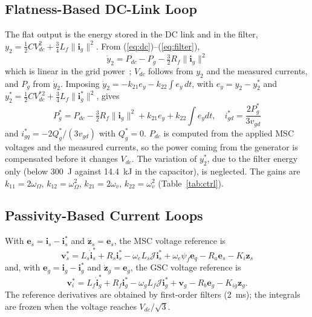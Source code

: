 \documentclass[11pt,a4paper]{article}
\newcommand{\bv}[1]{\mathbf{#1}}
\newcommand{\Jm}{\boldsymbol{\mathcal{J}}}
\begin{document}
\subsection{Flatness-Based DC-Link Loop}
The flat output is the energy stored in the DC link and in the filter,
$y_2=\frac12CV_{dc}^2+\frac34L_f\|\bv{i}_g\|^2$. From (\ref{eq:dc})--(\ref{eq:filter}),
\begin{equation}
\dot y_2 = P_{dc} - P_g - \tfrac32R_f\|\bv{i}_g\|^2
\label{eq:y2}
\end{equation}
which is linear in the grid power~\cite{thounthong2010}; $V_{dc}$ follows from $y_2$ and the measured
currents, and $P_g$ from $\dot y_2$. Imposing $\dot y_2=-k_{21}e_y-k_{22}\int e_y\,dt$, with
$e_y=y_2-y_2^*$ and $y_2^*=\frac12CV_{dc}^{*2}+\frac34L_f\|\bv{i}_g^*\|^2$, gives
\begin{equation}
P_g^* = P_{dc} - \tfrac32R_f\|\bv{i}_g\|^2 + k_{21}e_y + k_{22}\!\int\! e_y dt,\quad
i_{gd}^*=\frac{2P_g^*}{3v_{gd}}
\label{eq:flat2}
\end{equation}
and $i_{gq}^*=-2Q_g^*/(3v_{gd})$ with $Q_g^*=0$. $P_{dc}$ is computed from the applied MSC voltages and
the measured currents, so the power coming from the generator is compensated before it changes
$V_{dc}$. The variation of $y_2^*$, due to the filter energy only (below 300~J against 14.4~kJ in the
capacitor), is neglected. The gains are $k_{11}=2\omega_\Omega$, $k_{12}=\omega_\Omega^2$,
$k_{21}=2\omega_v$, $k_{22}=\omega_v^2$ (Table~\ref{tab:ctrl}).

\subsection{Passivity-Based Current Loops}
With $\bv{e}_s=\bv{i}_s-\bv{i}_s^*$ and $\dot{\bv{z}}_s=\bv{e}_s$, the MSC voltage reference is
\begin{equation}
\bv{v}_s^* = L_s\dot{\bv{i}}_s^* + R_s\bv{i}_s^* - \omega_eL_s\Jm\bv{i}_s^* + \omega_e\psi_f\bv{e}_q
- R_a\bv{e}_s - K_i\bv{z}_s
\label{eq:pbc1}
\end{equation}
and, with $\bv{e}_g=\bv{i}_g-\bv{i}_g^*$ and $\dot{\bv{z}}_g=\bv{e}_g$, the GSC voltage reference is
\begin{equation}
\bv{v}_i^* = L_f\dot{\bv{i}}_g^* + R_f\bv{i}_g^* - \omega_gL_f\Jm\bv{i}_g^* + \bv{v}_g
- R_b\bv{e}_g - K_{ig}\bv{z}_g .
\label{eq:pbc2}
\end{equation}
The reference derivatives are obtained by first-order filters (2~ms); the integrals are frozen when the
voltage reaches $V_{dc}/\sqrt3$.
\end{document}

